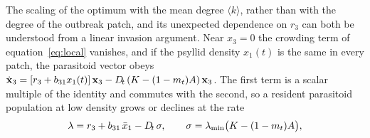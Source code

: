 The scaling of the optimum with the mean degree $\langle k\rangle$, rather than with the degree of the outbreak patch, and its unexpected dependence on $r_3$ can both be understood from a linear invasion argument. Near $x_3 = 0$ the crowding term of equation~\eqref{eq:local} vanishes, and if the psyllid density $x_1(t)$ is the same in every patch, the parasitoid vector obeys $\dot{\mathbf{x}}_3 = [r_3 + b_{31}x_1(t)]\,\mathbf{x}_3 - D_{\!t}\,(K - (1-m_t)A)\,\mathbf{x}_3$. The first term is a scalar multiple of the identity and commutes with the second, so a resident parasitoid population at low density grows or declines at the rate
\begin{equation}
  \lambda = r_3 + b_{31}\,\bar{x}_1 - D_{\!t}\,\sigma, \qquad
  \sigma = \lambda_{\min}\bigl(K - (1-m_t)A\bigr),
  \label{eq:invasion}
\end{equation}
